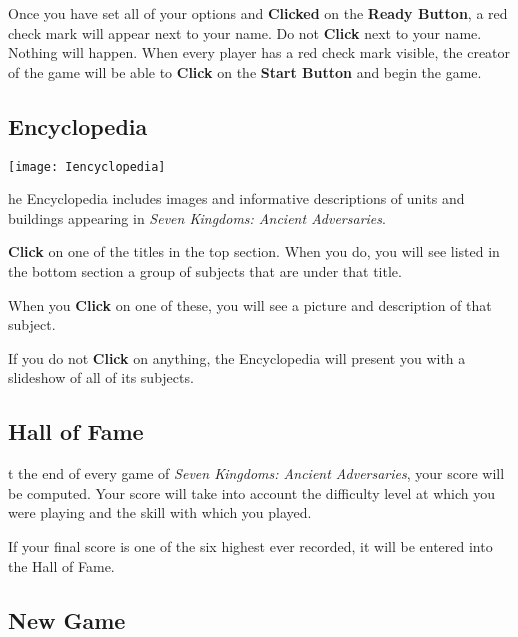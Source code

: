 Once you have set all of your options and \textbf{Clicked} on the \textbf{Ready Button}, a red check mark will appear next to your name. Do not \textbf{Click} next to your name. Nothing will happen. When every player has a red check mark visible, the creator of the game will be able to \textbf{Click} on the \textbf{Start Button} and begin the game.

\subsection{\textsf{Encyclopedia}}


\begin{center}
    \texttt{[image: Iencyclopedia]} %
\end{center}

he Encyclopedia includes images and informative descriptions of units and buildings appearing in \textit{Seven Kingdoms: Ancient Adversaries}.

\textbf{Click} on one of the titles in the top section. When you do, you will see listed in the bottom section a group of subjects that are under that title.

When you \textbf{Click} on one of these, you will see a picture and description of that subject.

If you do not \textbf{Click} on anything, the Encyclopedia will present you with a slideshow of all of its subjects.

\subsection{\textsf{Hall of Fame}}



t the end of every game of \textit{Seven Kingdoms: Ancient Adversaries}, your score will be computed. Your score will take into account the difficulty level at which you were playing and the skill with which you played.

If your final score is one of the six highest ever recorded, it will be entered into the Hall of Fame.

\subsection{\textsf{New Game}}

